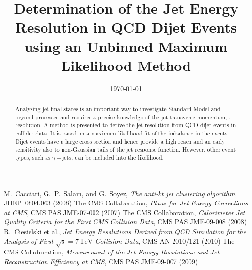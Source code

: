 \documentclass[a4paper]{cmspaper} %
\begin{document}
\begin{titlepage}
  \date{\today}
  \title{Determination of the Jet Energy Resolution in QCD Dijet
    Events using an Unbinned Maximum Likelihood Method}
  \begin{abstract}
    Analysing jet final states is an important way to investigate Standard Model and beyond processes and requires a precise knowledge of the jet transverse momentum, \pt, resolution.	
    A method is presented to derive the jet \pt resolution from QCD dijet events in collider data.
    It is based on a maximum likelihood fit of the \pt imbalance in the events.	
    Dijet events have a large cross section and hence provide a high \pt reach and an early sensitivity also to non-Gaussian tails of the jet response function.
    However, other event types, such as $\gamma+$jets, can be included into the likelihood.	
  \end{abstract}
\end{titlepage}
\tableofcontents









%
%
%





\begin{thebibliography}{9}
 M.~Cacciari, G.~P.~Salam, and G.~Soyez,
  \textit{The anti-kt jet clustering algorithm},
  JHEP~0804:063 (2008)
 The CMS Collaboration,
  \textit{Plans for Jet Energy Corrections at CMS},
  CMS PAS JME-07-002 (2007)
  The CMS Collaboration,
  \textit{Calorimeter Jet Quality Criteria for the First CMS Collision Data},
  CMS PAS JME-09-008 (2008)
 R.~Ciesielski et al.,
  \textit{Jet Energy Resolutions Derived from QCD Simulation for the Analysis of First $\sqrt{s}=7\,\mathrm{TeV}$ Collision Data},
  CMS AN 2010/121 (2010)
 The CMS Collaboration,
  \textit{Measurement of the Jet Energy Resolutions and Jet Reconstruction Efficiency at CMS},
  CMS PAS JME-09-007 (2009)
\end{thebibliography}
\end{document}
